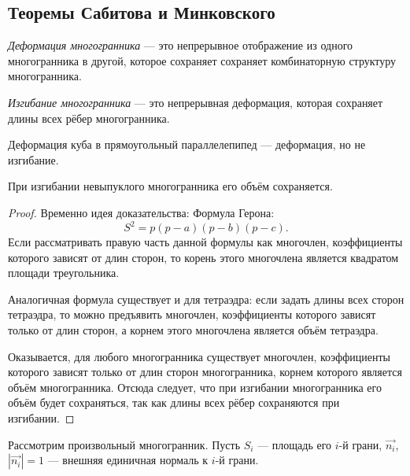 \subsection{Теоремы Сабитова и Минковского}
\begin{definition}
    \textit{Деформация многогранника} — это непрерывное отображение из одного многогранника в другой, которое сохраняет сохраняет комбинаторную структуру многогранника.
\end{definition} 
\begin{definition}
    \textit{Изгибание многогранника} — это непрерывная деформация, которая сохраняет длины всех рёбер многогранника.
\end{definition} 
\begin{example}
    Деформация куба в прямоугольный параллелепипед — деформация, но не изгибание.
\end{example}
\begin{theorem}[Сабитов]
    При изгибании невыпуклого многогранника его объём сохраняется.
\end{theorem}
\begin{proof}
    Временно идея доказательства: Формула Герона:
    \[S^2 = p(p - a)(p - b)(p - c).\]
    Если рассматривать правую часть данной формулы как многочлен, коэффициенты которого зависят от длин сторон, то корень этого многочлена является квадратом площади треугольника.

    Аналогичная формула существует и для тетраэдра: если задать длины всех сторон тетраэдра, то можно предъявить многочлен, коэффициенты которого зависят только от длин сторон, а корнем этого многочлена является объём тетраэдра.

    Оказывается, для любого многогранника существует многочлен, коэффициенты которого зависят только от длин сторон многогранника, корнем которого является объём многогранника. Отсюда следует, что при изгибании многогранника его объём будет сохраняться, так как длины всех рёбер сохраняются при изгибании.
\end{proof}

Рассмотрим произвольный многогранник. Пусть $S_i$ — площадь его $i$-й грани, $\overrightarrow{n_i}$, $|\overrightarrow{n_i}| = 1$ — внешняя единичная нормаль к $i$-й грани.

